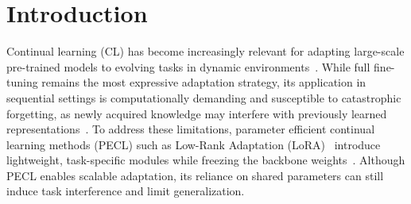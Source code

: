 \documentclass[letterpaper]{article} %
\begin{document}


\section{Introduction}


Continual learning (CL) has become increasingly relevant for adapting large-scale pre-trained models to evolving tasks in dynamic environments~\cite{PARISI201954,10444954,a2923225ea7d94e6c86faff97e23c69be,10.1145/3735633}. 
While full fine-tuning remains the most expressive adaptation strategy, its application in sequential settings is computationally demanding and susceptible to catastrophic forgetting, as newly acquired knowledge may interfere with previously learned representations~\cite{howard2018universallanguagemodelfinetuning,doi:10.1073/pnas.1611835114,pmlr-v234-zhai24a,luo2025empiricalstudycatastrophicforgetting}.
To address these limitations, parameter efficient continual learning methods (PECL) such as Low-Rank Adaptation (LoRA)~\cite{hu2022lora} introduce lightweight, task-specific modules while freezing the backbone weights~\cite{pmlr-v97-houlsby19a,dingParameterefficientFinetuningLargescale2023,He_2025_CVPR,NEURIPS2024_b0bc711f}.
Although PECL enables scalable adaptation, its reliance on shared parameters can still induce task interference and limit generalization.
\end{document}
